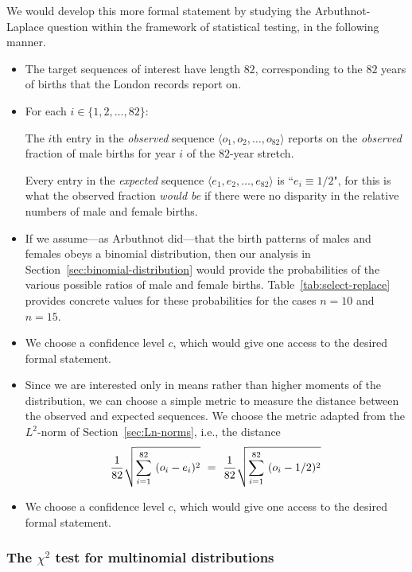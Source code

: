 \noindent
We would develop this more formal statement by studying the Arbuthnot-Laplace question within the framework of statistical testing, in the following manner.
\begin{itemize}
\item
The target sequences of interest have length $82$, corresponding to the $82$ years of births that the London records report on. 
\medskip\item
For each $i \in \{1,2, \ldots, 82\}$:

\smallskip

The $i$th entry in the {\em observed} sequence $\langle o_1, o_2, \ldots, o_{82} \rangle$ reports on the {\em observed} fraction of male births for year $i$ of the $82$-year stretch.

\smallskip

Every entry in the {\em expected} sequence $\langle e_1, e_2, \ldots, e_{82} \rangle$ is ``$e_i \equiv 1/2$", for this is what the observed fraction {\em would be} if there were no disparity in the relative numbers of male and female births.

\medskip\item
If we assume---as Arbuthnot did---that the birth patterns of males and females obeys a binomial distribution, then our analysis in Section~\ref{sec:binomial-distribution} would provide the probabilities of the various possible ratios of male and female births.  Table~\ref{tab:select-replace} provides concrete values for these probabilities for the cases $n=10$ and $n=15$.

\medskip\item
We choose a confidence level $c$, which would give one access to the desired formal statement.

\medskip\item
Since we are interested only in means rather than higher moments of the distribution, we can choose a simple metric to measure the distance between the observed and expected sequences.  We choose the metric adapted from the $L^2$-norm of Section~\ref{sec:Ln-norms}, i.e., the distance
\[ {1 \over 82} \sqrt{\sum_{i=1}^{82} \ (o_i -e_i)^2} \ = \
 {1 \over 82} \sqrt{\sum_{i=1}^{82} \ (o_i - 1/2)^2 } \]

\medskip\item
We choose a confidence level $c$, which would give one access to the desired formal statement.
\end{itemize}

\subsubsection{The $\chi^2$ test for multinomial distributions}

